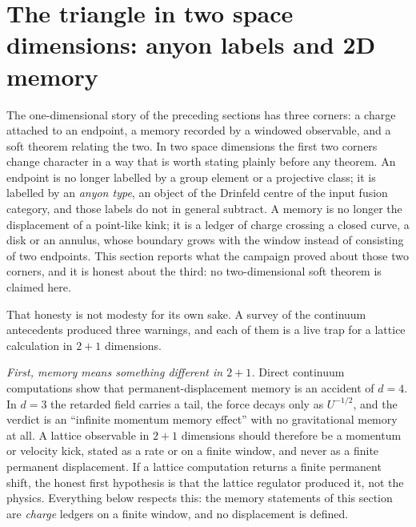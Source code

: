 
\newcommand{\tpLab}{\mathsf{A}}      %
\newcommand{\tpCat}{\mathcal{C}}     %
\newcommand{\tpDeph}{\mathcal{D}}    %
\newcommand{\tpWin}{W}               %

\section{The triangle in two space dimensions: anyon labels and 2D
memory}\label{sec:two-plus-one}

The one-dimensional story of the preceding sections has three corners: a
charge attached to an endpoint, a memory recorded by a windowed observable,
and a soft theorem relating the two. In two space dimensions the first two
corners change character in a way that is worth stating plainly before any
theorem. An endpoint is no longer labelled by a group element or a projective
class; it is labelled by an \emph{anyon type}, an object of the Drinfeld
centre of the input fusion category, and those labels do not in general
subtract. A memory is no longer the displacement of a point-like kink; it is a
ledger of charge crossing a closed curve, a disk or an annulus, whose boundary
grows with the window instead of consisting of two endpoints. This section
reports what the campaign proved about those two corners, and it is honest
about the third: no two-dimensional soft theorem is claimed here.

That honesty is not modesty for its own sake. A survey of the continuum
antecedents produced three warnings, and each of them is a live trap for a
lattice calculation in $2+1$ dimensions.

\emph{First, memory means something different in $2+1$.} Direct continuum
computations show that permanent-displacement memory is an accident of
$d=4$. In $d=3$ the retarded field carries a tail, the force decays only as
$U^{-1/2}$, and the verdict is an ``infinite momentum memory effect'' with no
gravitational memory at all. A lattice observable in $2+1$ dimensions should
therefore be a momentum or velocity kick, stated as a rate or on a finite
window, and never as a finite permanent displacement. If a lattice computation
returns a finite permanent shift, the honest first hypothesis is that the
lattice regulator produced it, not the physics. Everything below respects this:
the memory statements of this section are \emph{charge} ledgers on a finite
window, and no displacement is defined.

